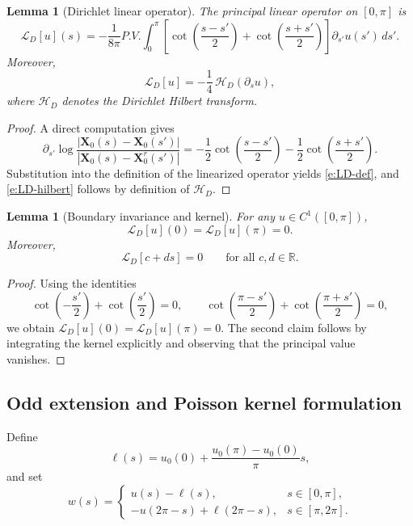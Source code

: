 \documentclass{amsart}
\newcommand{\mX}{\mathbf{X}}
\newcommand{\R}{\mathbb{R}}
\newtheorem{lemma}[theorem]{Lemma}
\begin{document}
\begin{lemma}[Dirichlet linear operator]
\label{lem:LD-def}
The principal linear operator on $[0,\pi]$ is
\begin{equation}\label{e:LD-def}
\mathcal{L}_D[u](s)
=
-\frac{1}{8\pi}P.V.\int_0^\pi
\left[
\cot\!\left(\frac{s-s'}{2}\right)
+
\cot\!\left(\frac{s+s'}{2}\right)
\right]\partial_{s'}u(s')\,ds'.
\end{equation}
Moreover,
\begin{equation}\label{e:LD-hilbert}
\mathcal{L}_D[u]
=
-\frac14\,\mathcal{H}_D(\partial_s u),
\end{equation}
where $\mathcal{H}_D$ denotes the Dirichlet Hilbert transform.
\end{lemma}

\begin{proof}
A direct computation gives
\[
\partial_{s'}\log\frac{|\mX_0(s)-\mX_0(s')|}{|\mX_0(s)-\mX_0^r(s')|}
=
-\frac12\cot\!\left(\frac{s-s'}{2}\right)
-\frac12\cot\!\left(\frac{s+s'}{2}\right).
\]
Substitution into the definition of the linearized operator yields
\eqref{e:LD-def}, and \eqref{e:LD-hilbert} follows by definition of
$\mathcal{H}_D$.
\end{proof}

\begin{lemma}[Boundary invariance and kernel]
\label{lem:LD-kernel}
For any $u\in C^1([0,\pi])$,
\[
\mathcal{L}_D[u](0)=\mathcal{L}_D[u](\pi)=0.
\]
Moreover,
\[
\mathcal{L}_D[c+ds]=0
\qquad\text{for all }c,d\in\R.
\]
\end{lemma}

\begin{proof}
Using the identities
\[
\cot\!\left(-\frac{s'}{2}\right)+\cot\!\left(\frac{s'}{2}\right)=0,
\qquad
\cot\!\left(\frac{\pi-s'}{2}\right)+\cot\!\left(\frac{\pi+s'}{2}\right)=0,
\]
we obtain $\mathcal{L}_D[u](0)=\mathcal{L}_D[u](\pi)=0$.
The second claim follows by integrating the kernel explicitly and observing
that the principal value vanishes.
\end{proof}

\subsection{Odd extension and Poisson kernel formulation}

Define
\begin{equation}\label{e:scalarelldef}
\ell(s)=u_0(0)+\frac{u_0(\pi)-u_0(0)}{\pi}s,
\end{equation}
and set
\[
w(s)=
\begin{cases}
u(s)-\ell(s), & s\in[0,\pi],\\
-u(2\pi-s)+\ell(2\pi-s), & s\in[\pi,2\pi].
\end{cases}
\]
\end{document}
